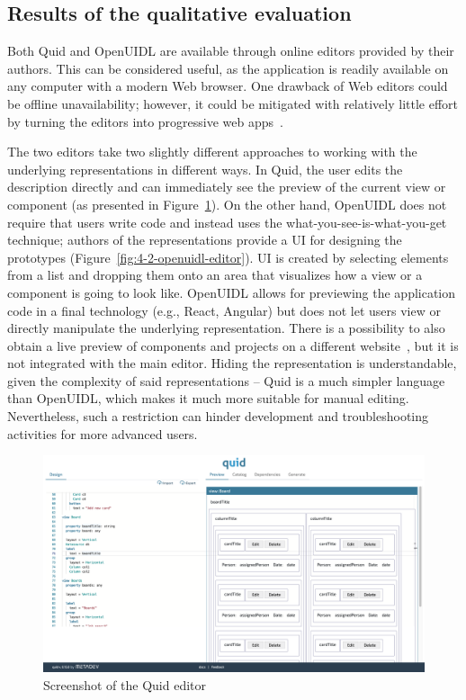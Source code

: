 \subsection{Results of the qualitative evaluation}\label{subsec:results-of-the-qualitative-evaluation}
Both Quid and OpenUIDL are available through online editors provided by their authors.
This can be considered useful, as the application is readily available on any computer with a modern Web browser.
One drawback of Web editors could be offline unavailability;
however, it could be mitigated with relatively little effort by turning the editors into progressive web apps~.

The two editors take two slightly different approaches to working with the underlying representations in different ways.
In Quid, the user edits the description directly and can immediately see the preview of the current view or component (as presented in Figure~\ref{fig:4-2-quid-editor}).
On the other hand, OpenUIDL does not require that users write code and instead uses the what-you-see-is-what-you-get technique; authors of the representations provide a UI for designing the prototypes (Figure~\ref{fig:4-2-openuidl-editor}).
UI is created by selecting elements from a list and dropping them onto an area that visualizes how a view or a component is going to look like.
OpenUIDL allows for previewing the application code in a final technology (e.g., React, Angular) but does not let users view or directly manipulate the underlying representation.
There is a possibility to also obtain a live preview of components and projects on a different website~, but it is not integrated with the main editor.
Hiding the representation is understandable, given the complexity of said representations -- Quid is a much simpler language than OpenUIDL, which makes it much more suitable for manual editing.
Nevertheless, such a restriction can hinder development and troubleshooting activities for more advanced users.

\begin{figure}
    \centering
    \includegraphics[width=\textwidth]{4-results-and-discussion/quid-editor}
    \caption{Screenshot of the Quid editor}
    \label{fig:4-2-quid-editor}
\end{figure}

